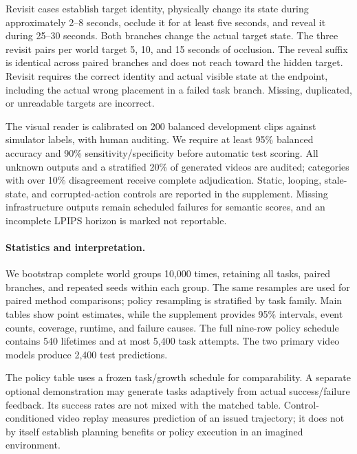 Revisit cases establish target identity, physically change its state during
approximately 2--8 seconds, occlude it for at least five seconds, and reveal it
during 25--30 seconds. Both branches change the actual target state.
The three revisit pairs per world target 5, 10, and 15 seconds of occlusion.
The reveal suffix is identical across paired branches and does not reach
toward the hidden target. Revisit requires the correct identity and actual
visible state at the endpoint, including the actual wrong placement in a
failed task branch. Missing, duplicated, or unreadable targets are incorrect.

The visual reader is calibrated on 200 balanced development clips against
simulator labels, with human auditing. We require at least 95\% balanced
accuracy and 90\% sensitivity/specificity before automatic test scoring.
All unknown outputs and a stratified 20\% of generated videos are audited;
categories with over 10\% disagreement receive complete adjudication.
Static, looping, stale-state, and corrupted-action controls are reported in
the supplement. Missing infrastructure outputs remain scheduled failures for
semantic scores, and an incomplete LPIPS horizon is marked not reportable.

\paragraph{Statistics and interpretation.}
We bootstrap complete world groups 10,000 times, retaining all tasks,
paired branches, and repeated seeds within each group. The same resamples
are used for paired method comparisons; policy resampling is stratified by
task family. Main tables show point estimates, while the supplement provides
95\% intervals, event counts, coverage, runtime, and failure causes.
The full nine-row policy schedule contains 540 lifetimes and at most 5,400
task attempts. The two primary video models produce 2,400 test predictions.

The policy table uses a frozen task/growth schedule for comparability.
A separate optional demonstration may generate tasks adaptively from actual
success/failure feedback. Its success rates are not mixed with the matched
table. Control-conditioned video replay measures prediction of an issued
trajectory; it does not by itself establish planning benefits or policy
execution in an imagined environment.
